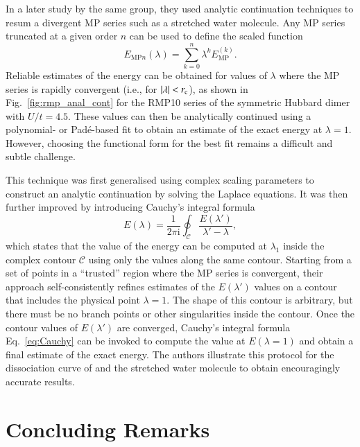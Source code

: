 \documentclass[aps,prb,reprint,noshowkeys,superscriptaddress]{revtex4-1}
\newcommand{\latin}[1]{#1}
\newcommand{\ie}{\latin{i.e.}}
\renewcommand{\i}{\mathrm{i}} %
\newcommand{\rc}{r_{\text{c}}}
\begin{document}
In a later study by the same group, they used analytic continuation techniques 
to resum a divergent MP series such as a stretched water molecule.\cite{Mihalka_2017a}
Any MP series truncated at a given order $n$ can be used to define the scaled function
\begin{equation}
   E_{\text{MP}n}(\lambda) = \sum_{k=0}^{n} \lambda^{k} E_\text{MP}^{(k)}.
\end{equation}
Reliable estimates of the energy can be obtained for values of $\lambda$ where the MP series is rapidly
convergent (\ie, for $\abs{\lambda} < \rc$), as shown in Fig.~\ref{fig:rmp_anal_cont} for the RMP10 series 
of the symmetric Hubbard dimer with $U/t = 4.5$.
These values can then be analytically continued using a polynomial- or Pad\'e-based fit to obtain an 
estimate of the exact energy at $\lambda = 1$.
However, choosing the functional form for the best fit remains a difficult and subtle challenge.

This technique was first generalised using complex scaling parameters to construct an analytic
continuation by solving the Laplace equations.\cite{Surjan_2018}
It was then further improved by introducing Cauchy's integral formula\cite{Mihalka_2019}
\begin{equation}
	\label{eq:Cauchy}
    E(\lambda) = \frac{1}{2\pi \i} \oint_{\mathcal{C}} \frac{E(\lambda')}{\lambda' - \lambda},
\end{equation}
which states that the value of the energy can be computed at $\lambda_1$ inside the complex 
contour $\mathcal{C}$ using only the values along the same contour.
Starting from a set of points in a ``trusted'' region where the MP series is convergent, their approach 
self-consistently refines estimates of the $E(\lambda')$ values on a contour that includes the physical point 
$\lambda = 1$.
The shape of this contour is arbitrary, but there must be no branch points or other singularities inside
the contour.
Once the contour values of $E(\lambda')$ are converged, Cauchy's integral formula Eq.~\eqref{eq:Cauchy} can 
be invoked to compute the value at $E(\lambda=1)$ and obtain a final estimate of the exact energy.
The authors illustrate this protocol for the dissociation curve of  and the stretched water 
molecule to obtain encouragingly accurate results.\cite{Mihalka_2019} 

\section{Concluding Remarks}
\label{sec:ccl}
\end{document}
